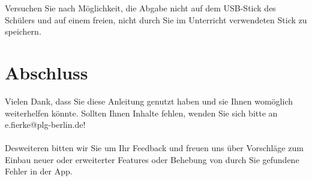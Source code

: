 \documentclass[]{article}
\begin{document}
	\begin{tcolorbox}[warning, title=Warnung: Datenschutz und Sicherheit]
		Versuchen Sie nach Möglichkeit, die Abgabe nicht auf dem USB-Stick des Schülers und auf einem freien, nicht durch Sie im Unterricht verwendeten Stick zu speichern.
	\end{tcolorbox}
	\vspace*{200pt}
	
	\section{Abschluss}
	Vielen Dank, dass Sie diese Anleitung genutzt haben und sie Ihnen womöglich weiterhelfen könnte. Sollten Ihnen Inhalte fehlen, wenden Sie sich bitte an e.fierke@plg-berlin.de!\\\\
	Desweiteren bitten wir Sie um Ihr Feedback und freuen uns über Vorschläge zum Einbau neuer oder erweiterter Features oder Behebung von durch Sie gefundene Fehler in der App.
	
	
	\label{LastPage}
\end{document}
